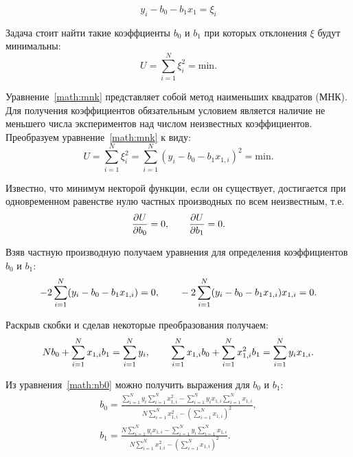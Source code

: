 \begin{equation}
    y_i - b_0 - b_1 x_1 = \xi_i
\end{equation}

Задача стоит найти такие коэффциенты $b_0$ и $b_1$ при которых отклонения $\xi$ будут минимальны:
\begin{equation}
    U = \sum_{i=1}^{N} \xi_i^2 = \text{min}.
    \label{math:mnk}
\end{equation}

Уравнение~\ref{math:mnk} представляет собой метод наименьших квадратов (МНК). Для получения коэффициентов обязательным условием является наличие не меньшего числа экспериментов над числом неизвестных коэффициентов. Преобразуем уравнение~\ref{math:mnk} к виду:
\begin{equation}
    U = \sum_{i=1}^{N} \xi_i^2 = \sum_{i=1}^{N}(y_i - b_0 - b_1 x_{1,i})^2 =  \text{min}.
    \label{math:mnk_full}
\end{equation}

Известно, что минимум некторой функции, если он существует, достигается при одновременном равенстве нулю частных производных по всем неизвестным, т.е.
\begin{equation}
    \frac{\partial{U}}{\partial{b_0}} = 0, \text{\hspace{2em}}  \frac{\partial{U}}{\partial{b_1}} = 0.
\end{equation}

Взяв частную производную получаем уравнения для определения коэффициентов $b_0$ и $b_1$:
\begin{equation}
    -2 \sum_{i=1}^{N}(y_i - b_0 - b_1 x_{1,i}) = 0, \text{\hspace{2em}} -2 \sum_{i=1}^{N}(y_i - b_0 - b_1 x_{1,i})x_{1,i} = 0.
\end{equation}

Раскрыв скобки и сделав некоторые преобразования получаем:
\begin{equation}
    Nb_0 + \sum_{i=1}^{N}x_{1,i}b_1 = \sum_{i=1}^{N}y_i,  \text{\hspace{2em}} \sum_{i=1}^{N}x_{1,i}b_0 + \sum_{i=1}^{N}x_{1,i}^2 b_1 = \sum_{i=1}^{N}y_i x_{1,i}.
    \label{math:nb0}
\end{equation}

Из уравнения~\ref{math:nb0} можно получить выражения для $b_0$ и $b_1$:
\begin{equation}
    \begin{split}
        b_0 = \frac{\sum\limits_{i=1}^{N}{y_i}\sum\limits_{i=1}^{N}x^2_{1,i} - \sum\limits_{i=1}^{N}{y_i x_{1,i}\sum\limits_{i=1}^{N}x_{1,i}}}{N\sum\limits_{i=1}^{N}{x_{1,i}^2 - \left(\sum\limits_{i=1}^N{x_{1,i}}\right)^2}}, \\[1em]
        b_1 = \frac{N\sum\limits_{i=1}^{N}{y_i x_{1,i}} - \sum\limits_{i=1}^{N}{y_i}\sum\limits_{i=1}^{N}x_{1,i}}{N\sum\limits_{i=1}^{N}{x_{1,i}^2 - \left(\sum\limits_{i=1}^N{x_{1,i}}\right)^2}}.
    \end{split}
\end{equation}

